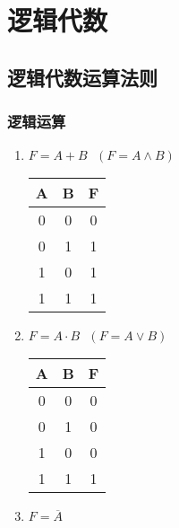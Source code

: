 \chapter{逻辑代数}
\newpage

\section{逻辑代数运算法则}

\subsection{逻辑运算}

\begin{enumerate}

    \item $F=A+B~~~(F=A\wedge B)$

          \begin{table}[!htbp]
              \centering
              \begin{tabular}{c|c|c}
                  \toprule
                  A & B & F \\
                  \midrule
                  0 & 0 & 0 \\
                  0 & 1 & 1 \\
                  1 & 0 & 1 \\
                  1 & 1 & 1 \\
                  \bottomrule
              \end{tabular}
          \end{table}

    \item $F=A\cdot B~~~(F=A\vee B)$

          \begin{table}[!htbp]
              \centering
              \begin{tabular}{c|c|c}
                  \toprule
                  A & B & F \\
                  \midrule
                  0 & 0 & 0 \\
                  0 & 1 & 0 \\
                  1 & 0 & 0 \\
                  1 & 1 & 1 \\
                  \bottomrule
              \end{tabular}
          \end{table}

    \item $F=\overline A$


\end{enumerate}
